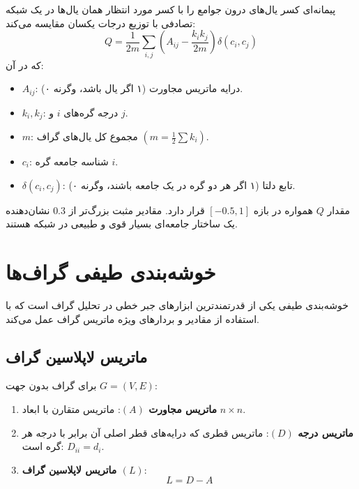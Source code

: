 \begin{definition}
پیمانه‌ای کسر یال‌های درون جوامع را با کسر مورد انتظار همان یال‌ها در یک شبکه تصادفی با توزیع درجات یکسان مقایسه می‌کند:
\begin{equation}
Q = \frac{1}{2m} \sum_{i, j} \left( A_{ij} - \frac{k_i k_j}{2m} \right) \delta(c_i, c_j)
\end{equation}
که در آن:
\begin{itemize}
    \item $A_{ij}$: درایه ماتریس مجاورت (۱ اگر یال باشد، وگرنه ۰).
    \item $k_i, k_j$: درجه گره‌های $i$ و $j$.
    \item $m$: مجموع کل یال‌های گراف $(m = \frac{1}{2}\sum k_i)$.
    \item $c_i$: شناسه جامعه گره $i$.
    \item $\delta(c_i, c_j)$: تابع دلتا (۱ اگر هر دو گره در یک جامعه باشند، وگرنه ۰).
\end{itemize}
\end{definition}

مقدار $Q$ همواره در بازه $[-0.5, 1]$ قرار دارد. مقادیر مثبت بزرگ‌تر از $0.3$ نشان‌دهنده یک ساختار جامعه‌ای بسیار قوی و طبیعی در شبکه هستند.

\section{خوشه‌بندی طیفی گراف‌ها \texorpdfstring{}{(Spectral Clustering)}}
خوشه‌بندی طیفی یکی از قدرتمندترین ابزارهای جبر خطی در تحلیل گراف است که با استفاده از مقادیر و بردارهای ویژه ماتریس گراف عمل می‌کند.

\subsection{ماتریس لاپلاسین گراف \texorpdfstring{}{(Graph Laplacian)}}
برای گراف بدون جهت $G = (V, E)$:
\begin{enumerate}
    \item \textbf{ماتریس مجاورت $(A)$}: ماتریس متقارن با ابعاد $n \times n$.
    \item \textbf{ماتریس درجه $(D)$}: ماتریس قطری که درایه‌های قطر اصلی آن برابر با درجه هر گره است: $D_{ii} = d_i$.
    \item \textbf{ماتریس لاپلاسین گراف $(L)$}:
    \begin{equation}
    L = D - A
    \end{equation}
\end{enumerate}


